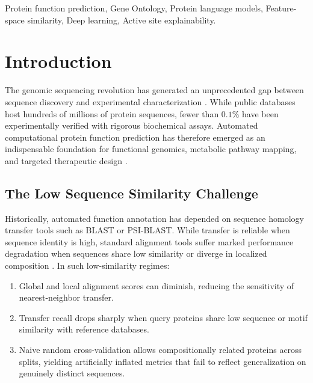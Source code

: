 \documentclass[journal]{IEEEtran}
\begin{document}
\begin{IEEEkeywords}
Protein function prediction, Gene Ontology, Protein language models, Feature-space similarity, Deep learning, Active site explainability.
\end{IEEEkeywords}

\section{Introduction}

The genomic sequencing revolution has generated an unprecedented gap between sequence discovery and experimental characterization \cite{uniprot2023}. While public databases host hundreds of millions of protein sequences, fewer than $0.1\%$ have been experimentally verified with rigorous biochemical assays. Automated computational protein function prediction has therefore emerged as an indispensable foundation for functional genomics, metabolic pathway mapping, and targeted therapeutic design \cite{radivojac2013large, jiang2016expanded, zhou2019cafa}.

\subsection{The Low Sequence Similarity Challenge}
Historically, automated function annotation has depended on sequence homology transfer tools such as BLAST or PSI-BLAST. While transfer is reliable when sequence identity is high, standard alignment tools suffer marked performance degradation when sequences share low similarity or diverge in localized composition \cite{rost1999twilight}. In such low-similarity regimes:
\begin{enumerate}
    \item Global and local alignment scores can diminish, reducing the sensitivity of nearest-neighbor transfer.
    \item Transfer recall drops sharply when query proteins share low sequence or motif similarity with reference databases.
    \item Naive random cross-validation allows compositionally related proteins across splits, yielding artificially inflated metrics that fail to reflect generalization on genuinely distinct sequences.
\end{enumerate}
\end{document}
